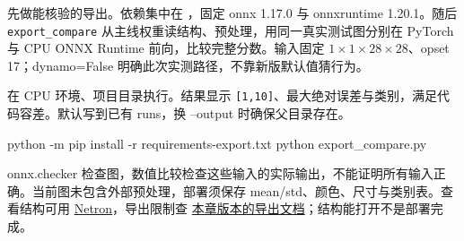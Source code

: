 先做能核验的导出。依赖集中在 ，固定 onnx 1.17.0 与 onnxruntime 1.20.1。随后 \texttt{export\_compare} 从主线权重读结构、预处理，用同一真实测试图分别在 PyTorch 与 CPU ONNX Runtime 前向，比较完整分数。输入固定 $1\times1\times28\times28$、opset 17；dynamo=False 明确此次实测路径，不靠新版默认值猜行为。
\begin{dlblock}

\end{dlblock}
\begin{example}[导出成功还要比较]
在 CPU 环境、项目目录执行。结果显示 \texttt{[1,10]}、最大绝对误差与类别，满足代码容差。默认写到已有 runs，换 --output 时确保父目录存在。
\begin{tbash}
python -m pip install -r requirements-export.txt
python export_compare.py
\end{tbash}
\end{example}
\begin{dlblock}

\end{dlblock}
\begin{dlblock}

\end{dlblock}
onnx.checker 检查图，数值比较检查这些输入的实际输出，不能证明所有输入正确。当前图未包含外部预处理，部署须保存 mean/std、颜色、尺寸与类别表。查看结构可用 \href{https://netron.app/}{Netron}，导出限制查 \href{https://docs.pytorch.org/docs/2.6/onnx.html}{本章版本的导出文档}；结构能打开不是部署完成。

